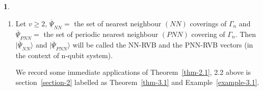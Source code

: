 \documentclass[a4paper,12pt]{article}
\theoremstyle{definition}
\theoremstyle{underlinethm}
\theoremstyle{definition}
\newtheorem{subsubsec}{}[subsection]
\begin{document}
\begin{subsubsec}
\begin{enumerate}[label=(\alph*)]
\item Let $v \geq 2 $, $\underline{\overline{\Psi}}_{NN} =$ the set of nearest neighbour $(NN)$ coverings of $\Gamma_{n}$ and $\underline{\overline{\Psi}}_{PNN} =$ the set of periodic nearest neighbour $(PNN)$  covering of $\Gamma_{n}$. Then $|\underline{\overline{\Psi}}_{NN} \rangle$ and $| \underline{\overline{\Psi}}_{PNN} \rangle$ will be called the NN-RVB and the PNN-RVB vectors (in the context of n-qubit system).

We record some immediate applications of Theorem~\ref{thm-2.1}, 2.2 above is section~\ref{section-2} labelled as Theorem~\ref{thm-3.1} and Example~\ref{example-3.1}.

\end{enumerate}

\end{subsubsec}
\end{document}
